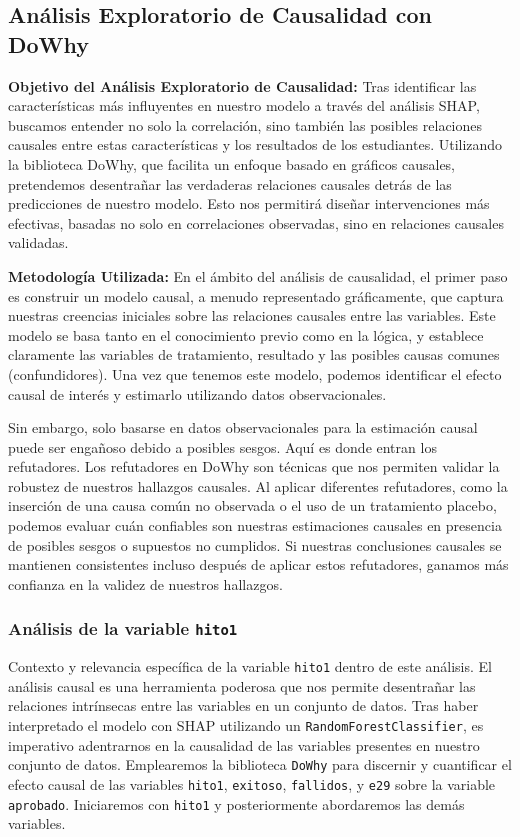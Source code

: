 
\subsection{Análisis Exploratorio de Causalidad con DoWhy}

\textbf{Objetivo del Análisis Exploratorio de Causalidad:} Tras identificar las características más influyentes en nuestro modelo a través del análisis SHAP, buscamos entender no solo la correlación, sino también las posibles relaciones causales entre estas características y los resultados de los estudiantes. Utilizando la biblioteca DoWhy, que facilita un enfoque basado en gráficos causales, pretendemos desentrañar las verdaderas relaciones causales detrás de las predicciones de nuestro modelo. Esto nos permitirá diseñar intervenciones más efectivas, basadas no solo en correlaciones observadas, sino en relaciones causales validadas.

\textbf{Metodología Utilizada:} En el ámbito del análisis de causalidad, el primer paso es construir un modelo causal, a menudo representado gráficamente, que captura nuestras creencias iniciales sobre las relaciones causales entre las variables. Este modelo se basa tanto en el conocimiento previo como en la lógica, y establece claramente las variables de tratamiento, resultado y las posibles causas comunes (confundidores). Una vez que tenemos este modelo, podemos identificar el efecto causal de interés y estimarlo utilizando datos observacionales.

Sin embargo, solo basarse en datos observacionales para la estimación causal puede ser engañoso debido a posibles sesgos. Aquí es donde entran los refutadores. Los refutadores en DoWhy son técnicas que nos permiten validar la robustez de nuestros hallazgos causales. Al aplicar diferentes refutadores, como la inserción de una causa común no observada o el uso de un tratamiento placebo, podemos evaluar cuán confiables son nuestras estimaciones causales en presencia de posibles sesgos o supuestos no cumplidos. Si nuestras conclusiones causales se mantienen consistentes incluso después de aplicar estos refutadores, ganamos más confianza en la validez de nuestros hallazgos.

\subsubsection{Análisis de la variable \texttt{hito1}}
Contexto y relevancia específica de la variable \texttt{hito1} dentro de este análisis.
El análisis causal es una herramienta poderosa que nos permite desentrañar las relaciones intrínsecas entre las variables en un conjunto de datos. Tras haber interpretado el modelo con SHAP utilizando un \texttt{RandomForestClassifier}, es imperativo adentrarnos en la causalidad de las variables presentes en nuestro conjunto de datos. Emplearemos la biblioteca \texttt{DoWhy} para discernir y cuantificar el efecto causal de las variables \texttt{hito1}, \texttt{exitoso}, \texttt{fallidos}, y \texttt{e29} sobre la variable \texttt{aprobado}. Iniciaremos con \texttt{hito1} y posteriormente abordaremos las demás variables.

